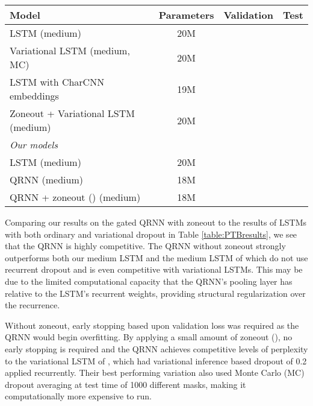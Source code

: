 \documentclass{article} \usepackage{iclr2017_conference,times}
\begin{document}
\begin{table*}[b]
\centering
\small
\begin{tabular}{l|ccc}
\toprule
\bf Model & \bf Parameters & \bf Validation &  \bf Test \\
\midrule
LSTM (medium) \citep{Zaremba2014} & 20M &  &  \\
Variational LSTM (medium, MC) \citep{Gal2015} & 20M &  &  \\
LSTM with CharCNN embeddings \citep{Kim2016} & 19M &  &  \\
Zoneout + Variational LSTM (medium) \citep{Merity2016} & 20M &  &  \\
\midrule
{\it Our models}\\
LSTM (medium) & 20M &  &  \\
QRNN (medium) & 18M &  &  \\
QRNN + zoneout () (medium) & 18M &  &  \\
\bottomrule
\end{tabular}
\caption{
Single model perplexity on validation and test sets for the Penn Treebank language modeling task. Lower is better.
``Medium'' refers to a two-layer network with 640 or 650 hidden units per layer. All QRNN models include dropout of 0.5 on embeddings and between layers.
MC refers to Monte Carlo dropout averaging at test time.
}
\label{table:PTBresults}
\end{table*}

Comparing our results on the gated QRNN with zoneout to the results of LSTMs with both ordinary and variational dropout in Table \ref{table:PTBresults}, we see that the QRNN is highly competitive.
The QRNN without zoneout strongly outperforms both our medium LSTM and the medium LSTM of \citet{Zaremba2014} which do not use recurrent dropout
and is even competitive with variational LSTMs.
This may be due to the limited computational capacity that the QRNN's pooling layer has relative to the LSTM's recurrent weights,
providing structural regularization over the recurrence.

Without zoneout, early stopping based upon validation loss was required as the QRNN would begin overfitting.
By applying a small amount of zoneout (), no early stopping is required and the QRNN achieves competitive levels of perplexity to the variational LSTM of \citet{Gal2015}, which had variational inference based dropout of 0.2 applied recurrently.
Their best performing variation also used Monte Carlo (MC) dropout averaging at test time of 1000 different masks, making it computationally more expensive to run.
\end{document}
